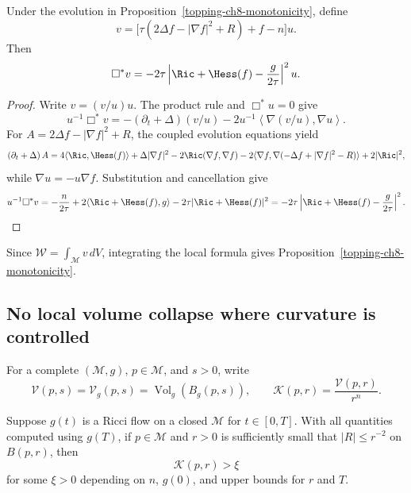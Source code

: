 \begin{proposition}
\label{topping-ch8-local-monotonicity}
Under the evolution in Proposition~\ref{topping-ch8-monotonicity}, define
\[
v=\bigl[\tau(2\Delta f-|\nabla f|^2+R)+f-n\bigr]u.
\]
Then
\[
\Box^*v=-2\tau\left|\Ric+\Hess(f)-\frac{g}{2\tau}\right|^2u.
\]
\end{proposition}

\begin{proof}
\sketch Write $v=(v/u)u$. The product rule and $\Box^*u=0$ give
\[
u^{-1}\Box^*v=-\left(\partial_t+\Delta\right)(v/u)
-2u^{-1}\left\langle\nabla(v/u),\nabla u\right\rangle.
\]
For $A=2\Delta f-|\nabla f|^2+R$, the coupled evolution equations yield
\[
\left(\partial_t+\Delta\right)A
=4\langle\Ric,\Hess(f)\rangle+\Delta|\nabla f|^2
-2\Ric(\nabla f,\nabla f)
-2\langle\nabla f,\nabla(-\Delta f+|\nabla f|^2-R)\rangle+2|\Ric|^2,
\]
while $\nabla u=-u\nabla f$. Substitution and cancellation give
\[
u^{-1}\Box^*v
=-\frac{n}{2\tau}+2\langle\Ric+\Hess(f),g\rangle
-2\tau|\Ric+\Hess(f)|^2
=-2\tau\left|\Ric+\Hess(f)-\frac{g}{2\tau}\right|^2.
\]
\end{proof}

\begin{remark}
\label{topping-ch8-proposition-implies-monotonicity}
Since $\mathcal W=\int_{\mathcal M}v\,dV$, integrating the local formula
gives Proposition~\ref{topping-ch8-monotonicity}.
\end{remark}

\subsection{No local volume collapse where curvature is controlled}

For a complete $(\mathcal M,g)$, $p\in\mathcal M$, and $s>0$, write
\[
\mathcal V(p,s)=\mathcal V_g(p,s)=\operatorname{Vol}_g(B_g(p,s)),
\qquad
\mathcal K(p,r)=\frac{\mathcal V(p,r)}{r^n}.
\]

\begin{theorem}
\label{topping-ch8-no-collapsing}
Suppose $g(t)$ is a Ricci flow on a closed $\mathcal M$ for $t\in[0,T]$.
With all quantities computed using $g(T)$, if $p\in\mathcal M$ and $r>0$ is
sufficiently small that $|R|\leq r^{-2}$ on $B(p,r)$, then
\[
\mathcal K(p,r)>\xi
\]
for some $\xi>0$ depending on $n$, $g(0)$, and upper bounds for $r$ and $T$.
\end{theorem}

